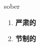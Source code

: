 
\begin{frame}
{\huge sober}
\begin{center}
\begin{enumerate}\Large
  \item \textbf{严肃的}
  \item \textbf{节制的}
\end{enumerate}
\end{center}
\end{frame}
